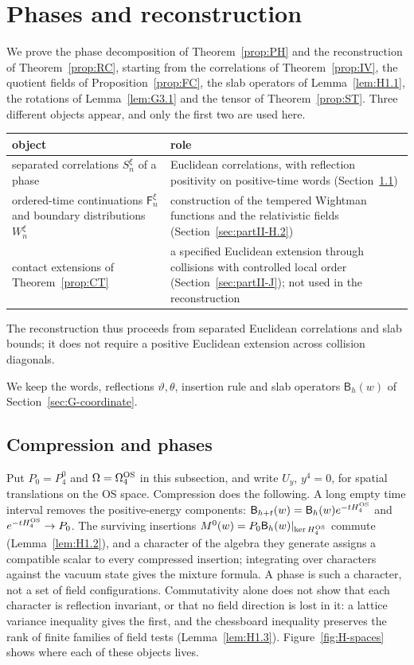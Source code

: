 \section{Phases and reconstruction}\label{sec:partII-H}

We prove the phase decomposition of Theorem~\ref{prop:PH} and the reconstruction of Theorem~\ref{prop:RC}, starting from the correlations of Theorem~\ref{prop:IV}, the quotient fields of Proposition~\ref{prop:FC}, the slab operators of Lemma~\ref{lem:H1.1}, the rotations of Lemma~\ref{lem:G3.1} and the tensor of Theorem~\ref{prop:ST}. Three different objects appear, and only the first two are used here.
\begin{center}
\small
\begin{tabular}{p{}p{}}
\toprule
object & role\\
\midrule
separated correlations $S^\xi_n$ of a phase & Euclidean correlations, with reflection positivity on positive-time words (Section~\ref{sec:partII-H.1})\\
ordered-time continuations $\mathsf F^\xi_n$ and boundary distributions $W^\xi_n$ & construction of the tempered Wightman functions and the relativistic fields (Section~\ref{sec:partII-H.2})\\
contact extensions of Theorem~\ref{prop:CT} & a specified Euclidean extension through collisions with controlled local order (Section~\ref{sec:partII-J}); not used in the reconstruction\\
\bottomrule
\end{tabular}
\end{center}
The reconstruction thus proceeds from separated Euclidean correlations and slab bounds; it does not require a positive Euclidean extension across collision diagonals.

We keep the words, reflections $\vartheta,\theta$, insertion rule and slab operators $\mathsf B_h(w)$ of Section~\ref{sec:G-coordinate}.

\subsection{Compression and phases}\label{sec:partII-H.1}

Put $P_0=P_4^0$ and $\Omega=\Omega_4^{\rm OS}$ in this subsection, and write $U_y$, $y^4=0$, for spatial translations on the OS space. Compression does the following. A long empty time interval removes the positive-energy components: $\mathsf B_{h+t}(w)=\mathsf B_h(w)e^{-tH_4^{\rm OS}}$ and $e^{-tH_4^{\rm OS}}\to P_0$. The surviving insertions $M^0(w)=P_0\mathsf B_h(w)|_{\ker H_4^{\rm OS}}$ commute (Lemma~\ref{lem:H1.2}), and a character of the algebra they generate assigns a compatible scalar to every compressed insertion; integrating over characters against the vacuum state gives the mixture formula. A phase is such a character, not a set of field configurations. Commutativity alone does not show that each character is reflection invariant, or that no field direction is lost in it: a lattice variance inequality gives the first, and the chessboard inequality preserves the rank of finite families of field tests (Lemma~\ref{lem:H1.3}). Figure~\ref{fig:H-spaces} shows where each of these objects lives.

